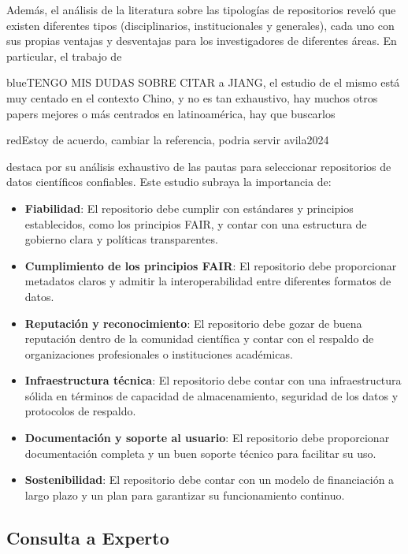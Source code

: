 \documentclass[runningheads]{llncs}
\def \bchregi {\begin{color}{red}}
\def \echregi {\end{color}}
\def \bchgon {\begin{color}{blue}}
\def \echgon {\end{color}}
\begin{document}
Además, el análisis de la literatura sobre las tipologías de repositorios reveló que existen diferentes tipos (disciplinarios, institucionales y generales), cada uno con sus propias ventajas y desventajas para los investigadores de diferentes áreas.
En particular, el trabajo de \cite{Jiang2023GlobalRepo} \bchgon TENGO MIS DUDAS SOBRE CITAR a JIANG, el estudio de el mismo está muy centado en el contexto Chino, y no es tan exhaustivo, hay muchos otros papers mejores o más centrados en latinoamérica, hay que buscarlos \echgon \bchregi Estoy de acuerdo, cambiar la referencia, podria servir avila2024 \echregi destaca por su análisis exhaustivo de las pautas para seleccionar repositorios de datos científicos confiables. Este estudio subraya la importancia de:
\begin{itemize}
    \item \textbf{Fiabilidad}: El repositorio debe cumplir con estándares y principios establecidos, como los principios FAIR, y contar con una estructura de gobierno clara y políticas transparentes.
    \item \textbf{Cumplimiento de los principios FAIR}: El repositorio debe proporcionar metadatos claros y admitir la interoperabilidad entre diferentes formatos de datos.
    \item \textbf{Reputación y reconocimiento}: El repositorio debe gozar de buena reputación dentro de la comunidad científica y contar con el respaldo de organizaciones profesionales o instituciones académicas.
    \item \textbf{Infraestructura técnica}: El repositorio debe contar con una infraestructura sólida en términos de capacidad de almacenamiento, seguridad de los datos y protocolos de respaldo.
    \item \textbf{Documentación y soporte al usuario}: El repositorio debe proporcionar documentación completa y un buen soporte técnico para facilitar su uso.
    \item \textbf{Sostenibilidad}: El repositorio debe contar con un modelo de financiación a largo plazo y un plan para garantizar su funcionamiento continuo.
\end{itemize}

\subsection{Consulta a Experto}
\end{document}
